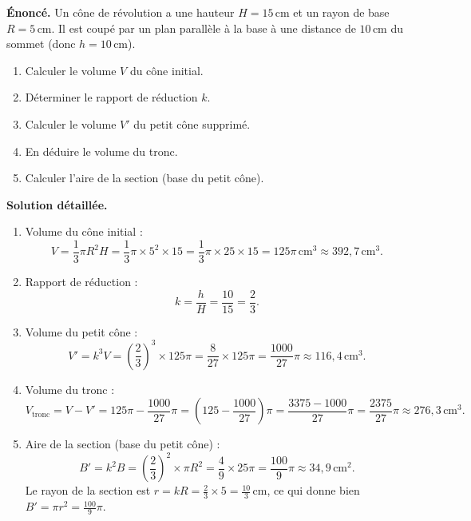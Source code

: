 \documentclass[11pt]{article}
\begin{document}
\begin{exoresolu}
\textbf{Énoncé.} Un cône de révolution a une hauteur $H = 15\,\text{cm}$ et un rayon de base $R = 5\,\text{cm}$. Il est coupé par un plan parallèle à la base à une distance de $10\,\text{cm}$ du sommet (donc $h = 10\,\text{cm}$). 
\begin{enumerate}
  \item Calculer le volume $V$ du cône initial.
  \item Déterminer le rapport de réduction $k$.
  \item Calculer le volume $V'$ du petit cône supprimé.
  \item En déduire le volume du tronc.
  \item Calculer l'aire de la section (base du petit cône).
\end{enumerate}
\tcblower
\textbf{Solution détaillée.}
\begin{enumerate}
  \item Volume du cône initial :
  \[
  V = \frac{1}{3}\pi R^2 H = \frac{1}{3}\pi \times 5^2 \times 15 = \frac{1}{3}\pi \times 25 \times 15 = 125\pi\,\text{cm}^3 \approx 392,7\,\text{cm}^3.
  \]
  \item Rapport de réduction :
  \[
  k = \frac{h}{H} = \frac{10}{15} = \frac{2}{3}.
  \]
  \item Volume du petit cône :
  \[
  V' = k^3 V = \left(\frac{2}{3}\right)^3 \times 125\pi = \frac{8}{27} \times 125\pi = \frac{1000}{27}\pi \approx 116,4\,\text{cm}^3.
  \]
  \item Volume du tronc :
  \[
  V_{\text{tronc}} = V - V' = 125\pi - \frac{1000}{27}\pi = \left(125 - \frac{1000}{27}\right)\pi = \frac{3375-1000}{27}\pi = \frac{2375}{27}\pi \approx 276,3\,\text{cm}^3.
  \]
  \item Aire de la section (base du petit cône) :
  \[
  B' = k^2 B = \left(\frac{2}{3}\right)^2 \times \pi R^2 = \frac{4}{9} \times 25\pi = \frac{100}{9}\pi \approx 34,9\,\text{cm}^2.
  \]
  Le rayon de la section est $r = kR = \frac{2}{3}\times 5 = \frac{10}{3}\,\text{cm}$, ce qui donne bien $B' = \pi r^2 = \frac{100}{9}\pi$.
\end{enumerate}
\end{exoresolu}
\end{document}
